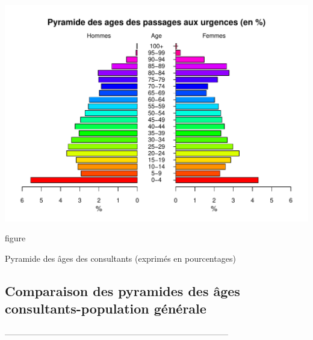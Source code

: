 \documentclass[12pt,english,french,twoside]{book}\usepackage[]{graphicx}\usepackage[]{color}
\makeatletter
\def\maxwidth{ %
  \ifdim\Gin@nat@width>\linewidth
    \linewidth
  \else
    \Gin@nat@width
  \fi
}
\newenvironment{knitrout}{}{} %
\makeatother
\begin{document}
\begin{center}
\begin{knitrout}
\color{fgcolor}
\includegraphics[width=\maxwidth]{figure/pyr_consult_p100-1} 

\end{knitrout}
\end{center}
\caption{figure}{Pyramide des âges des consultants (exprimés en pourcentages)}
\label{fig:tranches_age31}


\subsection*{Comparaison des pyramides des âges consultants-population générale}
--------------------------------------------------------------------------------
\end{document}
